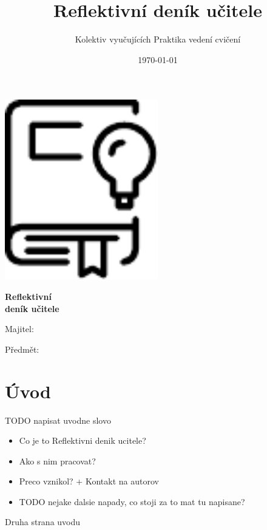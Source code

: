 \documentclass[twoside,openany,10pt]{book}
\title{Reflektivní deník učitele}
\author{Kolektiv vyučujících Praktika vedení cvičení}
\date{\today}
\begin{document}
\begin{titlepage}
	\centering
    \vspace*{1cm}
	\includegraphics[width=0.5\textwidth]{dennik}\par
	\vspace{0.5cm}
	{\huge\bfseries Reflektivní\\ deník učitele\par}
	\vfill
	\raggedright
    \Large
	Majitel:\par
    \vspace{0.2cm}
    Předmět:\par
\end{titlepage}


\chapter*{Úvod}

TODO napisat uvodne slovo

\begin{itemize}
\item Co je to Reflektivni denik ucitele?
\item Ako s nim pracovat?
\item Preco vznikol? + Kontakt na autorov
\item TODO nejake dalsie napady, co stoji za to mat tu napisane?
\end{itemize}

\newpage
Druha strana uvodu



\chapter{}
\vspace*{-2em}
\end{document}
